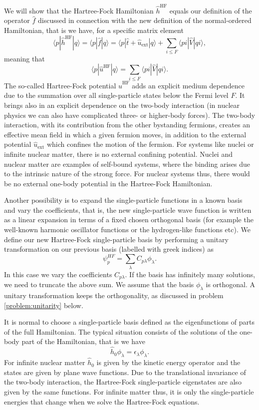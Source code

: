 We will show that the Hartree-Fock Hamiltonian $\hat{h}^{\mathrm{HF}}$
equals our definition of the operator $\hat{f}$ discussed in
connection with the new definition of the normal-ordered Hamiltonian,
that is we have, for a specific matrix element
\[
\langle p |\hat{h}^{\mathrm{HF}}| q \rangle =\langle p |\hat{f}| q
\rangle=\langle p|\hat{t}+\hat{u}_{\mathrm{ext}}|q \rangle +\sum_{i\le
  F} \langle pi | \hat{V} | qi\rangle,
\]
meaning that
\[
\langle p|\hat{u}^{\mathrm{HF}}|q\rangle = \sum_{i\le F} \langle pi |
\hat{V} | qi\rangle.
\]
The so-called Hartree-Fock potential $\hat{u}^{\mathrm{HF}}$ adds an
explicit medium dependence due to the summation over all
single-particle states below the Fermi level $F$. It brings also in an
explicit dependence on the two-body interaction (in nuclear physics we
can also have complicated three- or higher-body forces). The two-body
interaction, with its contribution from the other bystanding fermions,
creates an effective mean field in which a given fermion moves, in
addition to the external potential $\hat{u}_{\mathrm{ext}}$ which
confines the motion of the fermion. For systems like nuclei or
infinite nuclear matter, there is no external confining
potential. Nuclei and nuclear matter are examples of self-bound
systems, where the binding arises due to the intrinsic nature of the
strong force. For nuclear systems thus, there would be no external
one-body potential in the Hartree-Fock Hamiltonian.


Another possibility is to expand the single-particle functions in a
known basis and vary the coefficients, that is, the new
single-particle wave function is written as a linear expansion in
terms of a fixed chosen orthogonal basis (for example the well-known
harmonic oscillator functions or the hydrogen-like functions etc).  We
define our new Hartree-Fock single-particle basis by performing a
unitary transformation on our previous basis (labelled with greek
indices) as
\begin{equation}
\psi_p^{HF} = \sum_{\lambda}
C_{p\lambda}\phi_{\lambda}. \label{eq:newbasis}
\end{equation}
In this case we vary the coefficients $C_{p\lambda}$. If the basis has
infinitely many solutions, we need to truncate the above sum.  We
assume that the basis $\phi_{\lambda}$ is orthogonal. A unitary
transformation keeps the orthogonality, as discussed in problem
\ref{problem:unitarity} below.


It is normal to choose a single-particle basis defined as the
eigenfunctions of parts of the full Hamiltonian. The typical situation
consists of the solutions of the one-body part of the Hamiltonian,
that is we have
\[
\hat{h}_0\phi_{\lambda}=\epsilon_{\lambda}\phi_{\lambda}.
\]
For infinite nuclear matter $\hat{h}_0$ is given by the kinetic energy
operator and the states are given by plane wave functions. Due to the
translational invariance of the two-body interaction, the Hartree-Fock
single-particle eigenstates are also given by the same functions. For
infinite matter thus, it is only the single-particle energies that
change when we solve the Hartree-Fock equations.

